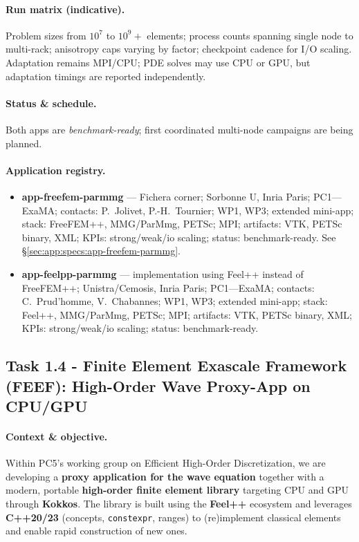 \paragraph{Run matrix (indicative).}
Problem sizes from $10^7$ to $10^9+$ elements; process counts spanning single node to multi-rack; anisotropy caps varying by factor; checkpoint cadence for I/O scaling.
Adaptation remains MPI/CPU; PDE solves may use CPU or GPU, but adaptation timings are reported independently.

\paragraph{Status \& schedule.}
Both apps are \emph{benchmark-ready}; first coordinated multi-node campaigns are being planned.
\paragraph{Application registry.}
\begin{itemize}
  \item \textbf{app-freefem-parmmg} — Fichera corner; Sorbonne U, Inria Paris; PC1—ExaMA; contacts: P.~Jolivet, P.-H.~Tournier; WP1, WP3; extended mini-app; stack: FreeFEM++, MMG/ParMmg, PETSc; MPI; artifacts: VTK, PETSc binary, XML; KPIs: strong/weak/io scaling; status: benchmark-ready. See \S\ref{sec:app:specs:app-freefem-parmmg}.
  \item \textbf{app-feelpp-parmmg} — implementation using Feel++ instead of FreeFEM++; Unistra/Cemosis, Inria Paris; PC1—ExaMA; contacts: C.~Prud’homme, V.~Chabannes; WP1, WP3; extended mini-app; stack: Feel++, MMG/ParMmg, PETSc; MPI; artifacts: VTK, PETSc binary, XML; KPIs: strong/weak/io scaling; status: benchmark-ready.
\end{itemize}


\medskip

\subsection{Task 1.4 - Finite Element Exascale Framework (FEEF): High-Order Wave Proxy-App on CPU/GPU}
\label{sec:wp1:t1.4}

\paragraph{Context \& objective.}
Within PC5’s working group on Efficient High-Order Discretization, we are developing a \textbf{proxy application for the wave equation} together with a modern, portable \textbf{high-order finite element library} targeting CPU and GPU through \textbf{Kokkos}. The library is built using the \textbf{Feel++} ecosystem and leverages \textbf{C++20/23} (concepts, \texttt{constexpr}, ranges) to (re)implement classical elements and enable rapid construction of new ones.


